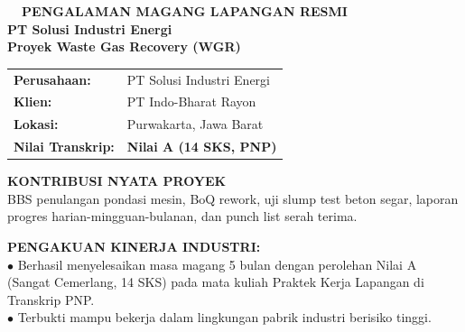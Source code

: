 \documentclass[10pt,a4paper,landscape]{article}
\begin{document}
\noindent
\begin{minipage}[t]{0.30\linewidth}
  \vspace{0pt}
  \begin{tcolorbox}[sharp corners, boxrule=0.8pt, colframe=pborder, colback=white, left=3mm, right=3mm, top=2.5mm, bottom=2.5mm, height=100mm]
    \colorbox{pred}{\fontsize{7pt}{8pt}\selectfont\bfseries\color{white}\ \ PENGALAMAN MAGANG LAPANGAN RESMI\ \ }\\[1.5mm]
    {\fontsize{9.5pt}{11.5pt}\selectfont\bfseries\color{pnavy}PT Solusi Industri Energi}\\[0.5mm]
    {\fontsize{7pt}{8.5pt}\selectfont\bfseries\color{pred}Proyek Waste Gas Recovery (WGR)}\\[2mm]

    \begin{tcolorbox}[sharp corners, boxrule=0.5pt, colframe=pborder, colback=pbglight, left=2mm, right=2mm, top=1.5mm, bottom=1.5mm]
      \begin{tabularx}{\linewidth}{@{}p{22mm} X@{}}
        {\fontsize{6.8pt}{8pt}\selectfont\bfseries Perusahaan:} & {\fontsize{6.8pt}{8pt}\selectfont PT Solusi Industri Energi} \\[0.8mm]
        {\fontsize{6.8pt}{8pt}\selectfont\bfseries Klien:} & {\fontsize{6.8pt}{8pt}\selectfont PT Indo-Bharat Rayon} \\[0.8mm]
        {\fontsize{6.8pt}{8pt}\selectfont\bfseries Lokasi:} & {\fontsize{6.8pt}{8pt}\selectfont Purwakarta, Jawa Barat} \\[0.8mm]
        {\fontsize{6.8pt}{8pt}\selectfont\bfseries Nilai Transkrip:} & {\fontsize{6.8pt}{8pt}\selectfont\bfseries\color{pred} Nilai A (14 SKS, PNP)}
      \end{tabularx}
    \end{tcolorbox}
    \vspace{1.5mm}

    {\fontsize{7.5pt}{9pt}\selectfont\bfseries\color{pnavy}KONTRIBUSI NYATA PROYEK}\\[0.8mm]
    {\fontsize{6.5pt}{8.2pt}\selectfont\color{psteel}
    BBS penulangan pondasi mesin, BoQ rework, uji slump test beton segar, laporan progres harian-mingguan-bulanan, dan punch list serah terima.
    }
  \end{tcolorbox}
  \vspace{2mm}

  \begin{tcolorbox}[sharp corners, boxrule=0.6pt, colframe=pnavy, colback=pbglight, left=2.5mm, right=2.5mm, top=2mm, bottom=2mm, height=52mm]
    {\fontsize{7pt}{8.5pt}\selectfont\bfseries\color{pnavy}PENGAKUAN KINERJA INDUSTRI:}\\[1.5mm]
    {\fontsize{6.5pt}{8.2pt}\selectfont\color{psteel}
    $\bullet$ Berhasil menyelesaikan masa magang 5 bulan dengan perolehan Nilai A (Sangat Cemerlang, 14 SKS) pada mata kuliah Praktek Kerja Lapangan di Transkrip PNP.\\
    $\bullet$ Terbukti mampu bekerja dalam lingkungan pabrik industri berisiko tinggi.
    }
  \end{tcolorbox}
\end{minipage}%
\end{document}
